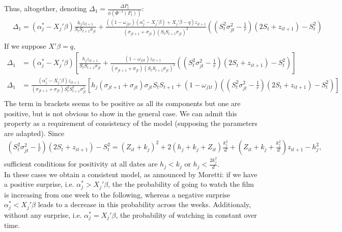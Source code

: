 	Thus, altogether, denoting $\Delta_{1}=\frac{\Delta P_{t}}{\phi(\Phi^{-1}(P_{t}))}$:
	\begin{align*}
		&\Delta_{1}= (\alpha_{j}^{*}-X_{j}'\beta)\frac{h_{j}z_{i t+1}}{S_{t}S_{t+1}\sigma_{j t}}+\frac{((1-\omega_{j 1 t})(\alpha_{j}^{*}-X_{j}'\beta)+X_{j}'\beta-q)z_{i t+1}}{(\sigma_{j t+1}+\sigma_{j t})(S_{t}S_{t+1}\sigma_{j t})^{2}} \left(\left(S_{t}^{2}\sigma_{j t}^{2}-\frac{1}{r}\right)(2S_{t}+z_{i t+1})-S_{t}^{2}\right)\\
	\end{align*}	
	If we suppose $X'\beta=q$,
	\begin{align*}
		\Delta_{1}&= (\alpha_{j}^{*}-X_{j}'\beta)\left[\frac{h_{j}z_{i t+1}}{S_{t}S_{t+1}\sigma_{j t}}+\frac{(1-\omega_{j 1 t})z_{i t+1}}{(\sigma_{j t+1}+\sigma_{j t})(S_{t}S_{t+1}\sigma_{j t})^{2}}\left(\left(S_{t}^{2}\sigma_{j t}^{2}-\frac{1}{r}\right)(2S_{t}+z_{i t+1})-S_{t}^{2}\right)\right]\\
		\Delta_{1}&= \frac{(\alpha_{j}^{*}-X_{j}'\beta)z_{i t+1}}{(\sigma_{j t+1}+\sigma_{j t})S_{t}^{2}S_{t+1}^{2}\sigma_{j t}^{2}}\left[h_{j}(\sigma_{j t+1}+\sigma_{j t})\sigma_{j t}S_{t}S_{t+1}+(1-\omega_{j 1 t})\left(\left(S_{t}^{2}\sigma_{j t}^{2}-\frac{1}{r}\right)(2S_{t}+z_{i t+1})-S_{t}^{2}\right)\right]\\
	\end{align*}	
	The term in brackets seems to be positive as all its components but one are positive, but is not obvious to show in the general case. We can admit this property as a requirement of consistency of the model (supposing the parameters are adapted). Since
	\begin{align*}
	\left(S_{t}^{2}\sigma_{j t}^{2}-\frac{1}{r}\right)(2S_{t}+z_{i t+1})-S_{t}^{2}=(Z_{i t}+k_{j})^{2}+2(h_{j}+k_{j}+Z_{i t})\frac{k_{j}^{2}}{d}+(Z_{i t}+k_{j}+\frac{k_{j}^{2}}{d})z_{i t+1}-h_{j}^{2},
	\end{align*}
	sufficient conditions for positivity at all dates are $h_{j}<k_{j}$ or $h_{j}<\frac{2k_{j}^{2}}{d}$.\\
	\medspace
	In these cases we obtain a consistent model, as announced by Moretti: if we have a positive surprise, i.e. $\alpha_{j}^{*}>X_{j}'\beta$, the the probability of going to watch the film is increasing from one week to the following, whereas a negative surprise $\alpha_{j}^{*}<X_{j}'\beta$ leads to a decrease in this probability across the weeks. Additionaly, without any surprise, i.e. $\alpha_{j}^{*}=X_{j}'\beta$, the probability of watching in constant over time.\\
